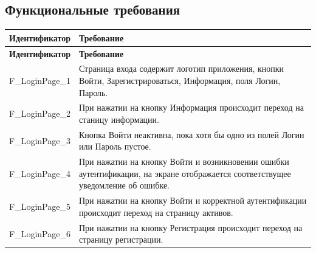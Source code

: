 \documentclass[a4paper, 14pt]{article}
\begin{document}
\subsection{Функциональные требования}

\begin{longtable}{| p{} | p{} |}
    \hline
    \textbf{Идентификатор}          & \textbf{Требование}                                                                                                                                                                \\
    \hline
    \endfirsthead
    \hline
    \textbf{Идентификатор}          & \textbf{Требование}                                                                                                                                                                \\
    \hline
    \endhead


    F\_LoginPage\_1                 & Страница входа содержит логотип приложения, кнопки Войти, Зарегистрироваться, Информация, поля Логин, Пароль.                                                                      \\ \hline
    F\_LoginPage\_2                 & При нажатии на кнопку Информация происходит переход на станицу информации.                                                                                                         \\ \hline
    F\_LoginPage\_3                 & Кнопка Войти неактивна, пока хотя бы одно из полей Логин или Пароль пустое.                                                                                                        \\ \hline
    F\_LoginPage\_4                 & При нажатии на кнопку Войти и возникновении ошибки аутентификации, на экране отображается соответствущее уведомление об ошибке.                                                    \\ \hline
    F\_LoginPage\_5                 & При нажатии на кнопку Войти и корректной аутентификации происходит переход на страницу активов.                                                                                    \\ \hline
    F\_LoginPage\_6                 & При нажатии на кнопку Регистрация происходит переход на страницу регистрации.                                                                                                      \\ \hline


\end{longtable}
\end{document}
